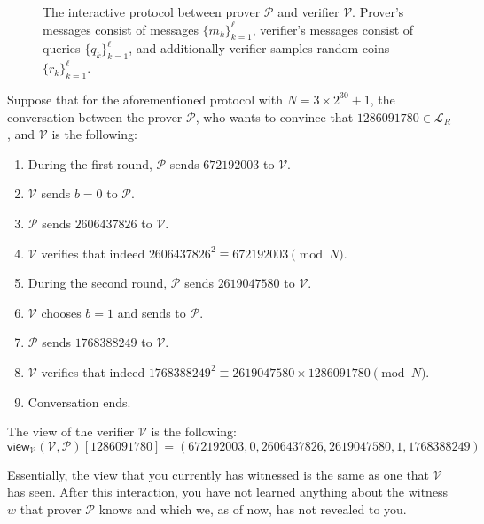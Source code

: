 \documentclass[../lecture-notes.tex]{subfiles}
\begin{document}
\begin{figure}[H]

    \caption{The interactive protocol between prover $\mathcal{P}$ and verifier $\mathcal{V}$. Prover's messages consist of messages $\{m_k\}_{k=1}^{\ell}$, verifier's messages consist of queries $\{q_k\}_{k=1}^{\ell}$, and additionally verifier samples random coins $\{r_k\}_{k=1}^{\ell}$.}
\end{figure}

\begin{example}
    Suppose that for the aforementioned protocol with $N=3 \times 2^{30} + 1$, the conversation between the prover $\mathcal{P}$, who wants to convince that $1286091780 \in \mathcal{L}_R$, and $\mathcal{V}$ is the following:
    \begin{enumerate}
        \item During the first round, $\mathcal{P}$ sends $672192003$ to $\mathcal{V}$.
        \item $\mathcal{V}$ sends $b=0$ to $\mathcal{P}$.
        \item $\mathcal{P}$ sends $2606437826$ to $\mathcal{V}$.
        \item $\mathcal{V}$ verifies that indeed $2606437826^2 \equiv 672192003 \pmod{N}$.
        \item During the second round, $\mathcal{P}$ sends $2619047580$ to $\mathcal{V}$.
        \item $\mathcal{V}$ chooses $b=1$ and sends to $\mathcal{P}$.
        \item $\mathcal{P}$ sends $1768388249$ to $\mathcal{V}$.
        \item $\mathcal{V}$ verifies that indeed $1768388249^2 \equiv 2619047580 \times 1286091780 \pmod{N}$.
        \item Conversation ends.
    \end{enumerate}

    The view of the verifier $\mathcal{V}$ is the following: 
    \begin{equation*}
        \mathsf{view}_{\mathcal{V}}(\mathcal{V}, \mathcal{P})[1286091780] = (672192003, 0, 2606437826, 2619047580, 1, 1768388249)
    \end{equation*}

    Essentially, the view that you currently has witnessed is the same as one that $\mathcal{V}$ has seen. After this interaction, you have not learned anything about the witness $w$ that prover $\mathcal{P}$ knows and which we, as of now, has not revealed to you.


\end{example}
\end{document}
